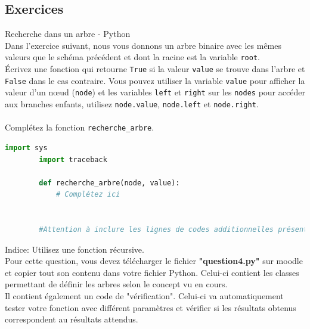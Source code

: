     \subsection{Exercices}
    
    \begin{Exercice}[20 minutes] Recherche dans un arbre - Python\\
        
        Dans l'exercice suivant, nous vous donnons un arbre binaire avec les mêmes valeurs que le schéma précédent et dont la racine est la variable \lstinline{root}.\\
    
        Écrivez une fonction qui retourne \lstinline{True} si la valeur \lstinline{value} se trouve dans l'arbre et \lstinline{False} dans le cas contraire. Vous pouvez utiliser la variable \lstinline{value} pour afficher la valeur d'un nœud (\lstinline{node}) et les variables \lstinline{left} et \lstinline{right} sur les \lstinline{nodes} pour accéder aux branches enfants, utilisez \lstinline{node.value}, \lstinline{node.left} et \lstinline{node.right}.\\\\
        Complétez la fonction \lstinline{recherche_arbre}.\\
        \begin{lstlisting}[language=Python]
        import sys
        import traceback
    
        def recherche_arbre(node, value):
            # Complétez ici
            
            
        #Attention à inclure les lignes de codes additionnelles présentes dans le fichier "question4.py" sur Moodle
        \end{lstlisting}
    
        \begin{conseil}
        Indice: Utilisez une fonction récursive.\\
        
        Pour cette question, vous devez télécharger le fichier \textbf{"question4.py"} sur moodle et copier tout son contenu dans votre fichier Python. Celui-ci contient les classes permettant de définir les arbres selon le concept vu en cours. \\
        
        Il contient également un code de "vérification". Celui-ci va automatiquement tester votre fonction avec différent paramètres et vérifier si les résultats obtenus correspondent au résultats attendus.
        \end{conseil}
    
        \begin{solution}
            
        \end{solution}

    
    \end{Exercice}
    
    
